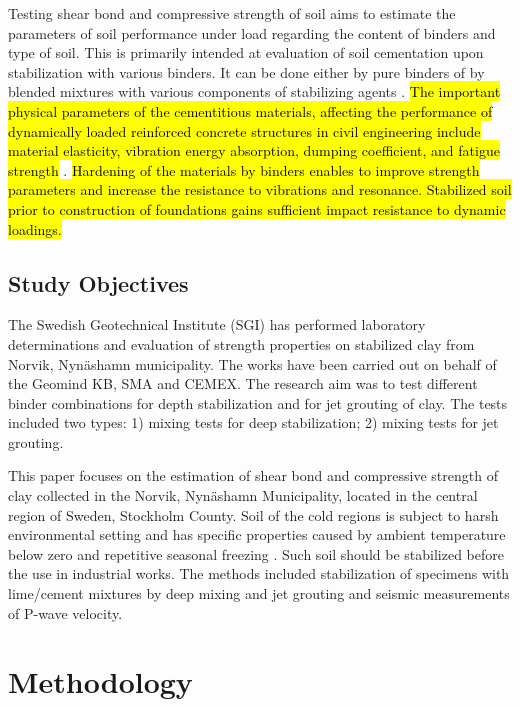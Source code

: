 \documentclass[USenglish,twocolumn]{article}
\begin{document}
Testing shear bond and compressive strength of soil aims to estimate the parameters of soil performance under load regarding the content of binders and type of soil. This is primarily intended at evaluation of soil cementation upon stabilization with various binders. It can be done either by pure binders of by blended mixtures with various components of stabilizing agents \citep{HOV2022101162,Bakaiyang}. \hl{The important physical parameters of the cementitious materials, affecting the performance of dynamically loaded reinforced concrete structures in civil engineering include material elasticity, vibration energy absorption, dumping coefficient, and fatigue strength} \cite{Golewski2019}. \hl{Hardening of the materials by binders enables to improve strength parameters and increase the resistance to vibrations and resonance. Stabilized soil prior to construction of foundations gains sufficient impact resistance to dynamic loadings.}

\subsection{Study Objectives}

The Swedish Geotechnical Institute (SGI) has performed laboratory determinations and evaluation of strength properties on stabilized clay from Norvik, Nynäshamn municipality. The works have been carried out on behalf of the Geomind KB, SMA and CEMEX. The research aim was to test different binder combinations for depth stabilization and for jet grouting of clay. The tests included two types: 1) mixing tests for deep stabilization; 2) mixing tests for jet grouting. 

This paper focuses on the estimation of shear bond and compressive strength of clay collected in the Norvik, Nynäshamn Municipality, located in the central region of Sweden, Stockholm County. Soil of the cold regions is subject to harsh environmental setting and has specific properties caused by ambient temperature below zero and repetitive seasonal freezing \cite{LindhWinter,Lemenkov2021b,Lemenkov2021a,Sato}. Such soil should be stabilized before the use in industrial works. The methods included stabilization of specimens with lime/cement mixtures by deep mixing and jet grouting and seismic measurements of P-wave velocity. 


\section{Methodology}
\end{document}
